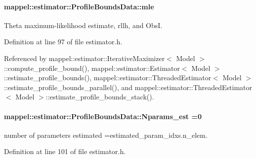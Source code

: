 \paragraph[{\texorpdfstring{mle}{mle}}]{ mappel\+::estimator\+::\+Profile\+Bounds\+Data\+::mle}\hypertarget{structmappel_1_1estimator_1_1ProfileBoundsData_a719ed1845a32b5e7af3f7e2fdd18149d}{}\label{structmappel_1_1estimator_1_1ProfileBoundsData_a719ed1845a32b5e7af3f7e2fdd18149d}


Theta maximum-\/likelihood estimate, rllh, and ObsI. 



Definition at line 97 of file estimator.\+h.



Referenced by mappel\+::estimator\+::\+Iterative\+Maximizer$<$ Model $>$\+::compute\+\_\+profile\+\_\+bound(), mappel\+::estimator\+::\+Estimator$<$ Model $>$\+::estimate\+\_\+profile\+\_\+bounds(), mappel\+::estimator\+::\+Threaded\+Estimator$<$ Model $>$\+::estimate\+\_\+profile\+\_\+bounds\+\_\+parallel(), and mappel\+::estimator\+::\+Threaded\+Estimator$<$ Model $>$\+::estimate\+\_\+profile\+\_\+bounds\+\_\+stack().

\paragraph[{\texorpdfstring{Nparams\+\_\+est}{Nparams_est}}]{ mappel\+::estimator\+::\+Profile\+Bounds\+Data\+::\+Nparams\+\_\+est =0}\hypertarget{structmappel_1_1estimator_1_1ProfileBoundsData_a5dd4b18893235445bca9608d5746c6c2}{}\label{structmappel_1_1estimator_1_1ProfileBoundsData_a5dd4b18893235445bca9608d5746c6c2}


number of parameters estimated =estimated\+\_\+param\+\_\+idxs.\+n\+\_\+elem. 



Definition at line 101 of file estimator.\+h.



